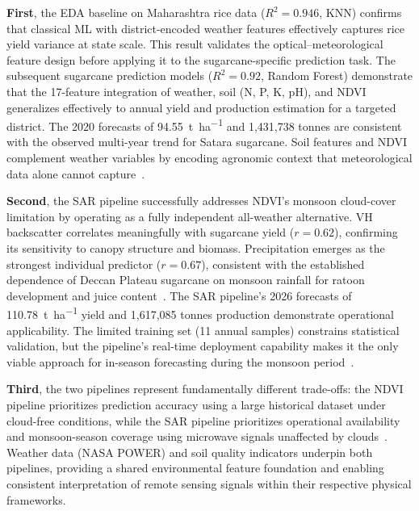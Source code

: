\documentclass[conference]{IEEEtran}
\begin{document}
\textbf{First}, the EDA baseline on Maharashtra rice data ($R^2 = 0.946$,
KNN) confirms that classical ML with district-encoded weather features
effectively captures rice yield variance at state scale. This result
validates the optical--meteorological feature design before applying it to
the sugarcane-specific prediction task. The subsequent sugarcane prediction
models ($R^2 = 0.92$, Random Forest) demonstrate that the 17-feature
integration of weather, soil (N, P, K, pH), and NDVI generalizes effectively
to annual yield and production estimation for a targeted district.
The 2020 forecasts of \SI{94.55}{\tonne\per\hectare} and 1{,}431{,}738 tonnes
are consistent with the observed multi-year trend for Satara sugarcane.
Soil features and NDVI complement weather variables by encoding agronomic
context that meteorological data alone cannot capture~\cite{kameoka2025}.

\textbf{Second}, the SAR pipeline successfully addresses NDVI's monsoon
cloud-cover limitation by operating as a fully independent all-weather
alternative. VH backscatter correlates meaningfully with sugarcane yield
($r = 0.62$), confirming its sensitivity to canopy structure and biomass.
Precipitation emerges as the strongest individual predictor ($r = 0.67$),
consistent with the established dependence of Deccan Plateau sugarcane on
monsoon rainfall for ratoon development and juice content~\cite{karande2016}.
The SAR pipeline's 2026 forecasts of \SI{110.78}{\tonne\per\hectare} yield
and 1{,}617{,}085 tonnes production demonstrate operational applicability.
The limited training set (11 annual samples) constrains statistical
validation, but the pipeline's real-time deployment capability makes it the
only viable approach for in-season forecasting during the monsoon
period~\cite{esa2022,mandal2020}.

\textbf{Third}, the two pipelines represent fundamentally different trade-offs:
the NDVI pipeline prioritizes prediction accuracy using a large historical
dataset under cloud-free conditions, while the SAR pipeline prioritizes
operational availability and monsoon-season coverage using microwave signals
unaffected by clouds~\cite{uribe2023,chen2023}. Weather data (NASA POWER)
and soil quality indicators underpin both pipelines, providing a shared
environmental feature foundation and enabling consistent interpretation of
remote sensing signals within their respective physical frameworks.

\end{document}
